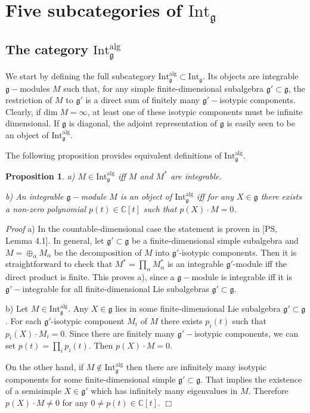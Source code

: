 \documentclass[10pt]{amsart}
\newcounter{theorem}
\newtheorem{prop}[theo]{Proposition}
\renewenvironment{proof}{ \emph{Proof}}{$\Box$}
\newcommand {\CC} {\mathbb {C}}
\renewcommand{\gg}{\mathfrak{g}}
\newcommand{\alg}{\mathrm{alg}}
\begin{document}
\vspace*{0.5cm}
\section{Five subcategories of $\mathrm{Int}_{\gg}$}\label{sect:3}

\subsection{The category $\mathrm{Int}_{\gg}^\alg$}\label{sect:3.1}
We start by defining the full subcategory $\mathrm{Int}_{\gg}^\alg \subset \mathrm{Int}_{\gg}$. Its objects are integrable $\gg-$modules $M$ such that, for any simple finite-dimensional subalgebra $\gg'\subset\gg$, the restriction of $M$ to $\gg'$ is a direct sum of finitely many $\gg'-$isotypic components. Clearly, if $\mathrm{dim}\;M=\infty$, at least one of these isotypic components must be infinite dimensional. If $\gg$ is diagonal, the adjoint representation of $\gg$ is easily seen to be an object of $\mathrm{Int}_{\gg}^\alg$.  

The following proposition provides equivalent definitions of $\mathrm{Int}_{\gg}^\alg$. 

\begin{prop}\label{alg1} a) $M\in\mathrm{Int}_{\gg}^\alg$ iff $M$ and $M^*$ are integrable.

b) An integrable $\gg-$module $M$ is an object of $\mathrm{Int}_{\gg}^\alg$ iff for any $X\in\gg$ there exists a non-zero polynomial $p(t)\in\CC[t]$ such that $p(X)\cdot M=0$.
\end{prop}
\begin{proof} a) In the countable-dimensional case the statement is proven in [PS, Lemma 4.1].
In general, let $\gg'\subset\gg$ be a finite-dimensional simple subalgebra and $M=\oplus_\alpha M_\alpha$ be the decomposition of $M$ into $\gg'$-isotypic components. Then it is straightforward to check that $M^*=\prod_\alpha M_\alpha^*$ is an integrable $\gg'$-module iff the direct product is finite. This proves a), since a $\gg-$module is integrable iff it is $\gg'-$integrable for all finite-dimensional Lie subalgebras $\gg' \subset \gg$.

b) Let $M\in \mathrm{Int}_{\gg}^\alg$. Any $X\in\gg$ lies in some finite-dimensional Lie subalgebra $\gg' \subset \gg$. For each $\gg'$-isotypic component $M_i$ of $M$ there exists $p_i(t)$ such that $p_i(X) \cdot M_i = 0$. Since there are finitely many $\gg'-$isotypic components, we can set $p(t)=\prod_i p_i(t)$. Then $p(X) \cdot M = 0$. 

On the other hand, if $M\notin  \mathrm{Int}_{\gg}^\alg$ then there are infinitely many isotypic components for some finite-dimensional simple $\gg'\subset\gg$. That implies the existence of a semisimple $X\in \gg'$ which has infinitely many eigenvalues in $M$. Therefore $p(X) \cdot M \neq 0$ for any $0 \neq p(t) \in \CC[t]$. 
\end{proof}
\end{document}
